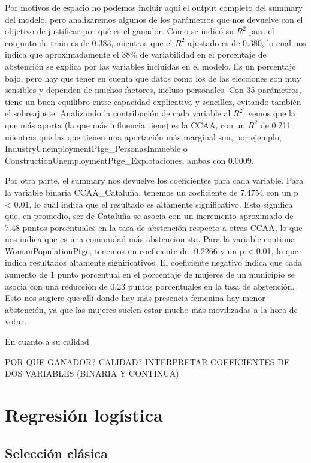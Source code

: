 \documentclass[a4paper,onecolumn]{extarticle}
\begin{document}
\begin{sloppypar}
Por motivos de espacio no podemos incluir aquí el output completo del summary del modelo, pero analizaremos algunos de los parámetros que nos devuelve con el 
objetivo de justificar por qué es el ganador. Como se indicó su $R^2$ para el conjunto de train es de 0.383, mientras que el $R^2$ ajustado es de 0.380, lo cual 
nos indica que aproximadamente el 38\% de variabilidad en el porcentaje de abstención se explica por las variables incluidas en el modelo. Es un porcentaje bajo,
pero hay que tener en cuenta que datos como los de las elecciones son muy sensibles y dependen de muchos factores, incluso personales. Con 35 parámetros, tiene 
un buen equilibro entre capacidad explicativa y sencillez, evitando también el sobreajuste. Analizando la contribución de cada variable al $R^2$, vemos que la 
que más aporta (la que más influencia tiene) es la CCAA, con un $R^2$ de 0.211; mientras que las que tienen una aportación más marginal son, por ejemplo, 
IndustryUnemploymentPtge\_PersonasInmueble o ConstructionUnemploymentPtge\_Explotaciones, ambas con 0.0009.

Por otra parte, el summary nos devuelve los coeficientes para cada variable. Para la variable binaria CCAA\_Cataluña, tenemos un coeficiente de 7.4754 con un 
p < 0.01, lo cual indica que el resultado es altamente significativo. Esto significa que, en promedio, ser de Cataluña se asocia con un incremento aproximado
de 7.48 puntos porcentuales en la tasa de abstención respecto a otras CCAA, lo que nos indica que es una comunidad más abstencionista. Para la variable 
continua WomanPopulationPtge, tenemos un coeficiente de -0.2266 y un p < 0.01, lo que indica resultados altamente significativos. El coeficiente negativo indica 
que cada aumento de 1 punto porcentual en el porcentaje de mujeres de un municipio se asocia con una reducción de 0.23 puntos porcentuales en la tasa de 
abstención. Esto nos sugiere que allí donde hay más presencia femenina hay menor abstención, ya que las mujeres suelen estar mucho más movilizadas a la hora 
de votar.

En cuanto a su calidad

POR QUE GANADOR? CALIDAD? INTERPRETAR COEFICIENTES DE DOS VARIABLES (BINARIA Y CONTINUA)

\section{Regresión logística}\label{logistica}
\subsection{Selección clásica}\label{logclasica}


\end{sloppypar}
\end{document}
